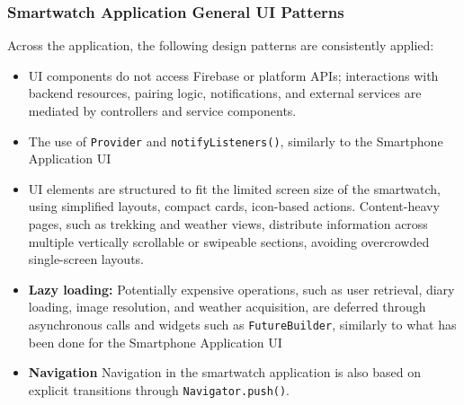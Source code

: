 \subsubsection{Smartwatch Application General UI Patterns}

Across the application, the following design patterns are consistently applied:

\begin{itemize}
    \item UI components do not access Firebase or platform APIs; interactions with backend resources, pairing logic, notifications, and external services are mediated by controllers and service components.
    \item The use of \texttt{Provider} and \texttt{notifyListeners()}, similarly to the Smartphone Application UI
    \item UI elements are structured to fit the limited screen size of the smartwatch, using simplified layouts, compact cards, icon-based actions. Content-heavy pages, such as trekking and weather views, distribute information across multiple vertically scrollable or swipeable sections, avoiding overcrowded single-screen layouts.
    \item \textbf{Lazy loading:} Potentially expensive operations, such as user retrieval, diary loading, image resolution, and weather acquisition, are deferred through asynchronous calls and widgets such as \texttt{FutureBuilder}, similarly to what has been done for the Smartphone Application UI
    \item \textbf{Navigation} Navigation in the smartwatch application is also based on explicit transitions through \texttt{Navigator.push()}.
\end{itemize}
\newpage
